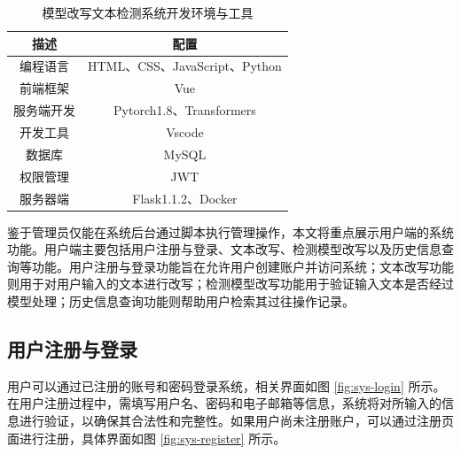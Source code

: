 \begin{table}[htbp]
    \centering
    \caption{模型改写文本检测系统开发环境与工具}
    \label{tab:sys-env}
    \begin{tabular}{cc}
        \toprule
        \textbf{描述} & \textbf{配置} \\
        \midrule
        编程语言 & HTML、CSS、JavaScript、Python \\
        前端框架 & Vue \\
        服务端开发 & Pytorch1.8、Transformers \\
        开发工具 & Vscode \\
        数据库 & MySQL \\
        权限管理 & JWT \\
        服务器端 & Flask1.1.2、Docker \\
        \bottomrule
    \end{tabular}
\end{table}

鉴于管理员仅能在系统后台通过脚本执行管理操作，本文将重点展示用户端的系统功能。用户端主要包括用户注册与登录、文本改写、检测模型改写以及历史信息查询等功能。用户注册与登录功能旨在允许用户创建账户并访问系统；文本改写功能则用于对用户输入的文本进行改写；检测模型改写功能用于验证输入文本是否经过模型处理；历史信息查询功能则帮助用户检索其过往操作记录。

\subsection{用户注册与登录}

用户可以通过已注册的账号和密码登录系统，相关界面如图 \ref{fig:sys-login} 所示。在用户注册过程中，需填写用户名、密码和电子邮箱等信息，系统将对所输入的信息进行验证，以确保其合法性和完整性。如果用户尚未注册账户，可以通过注册页面进行注册，具体界面如图 \ref{fig:sys-register} 所示。

